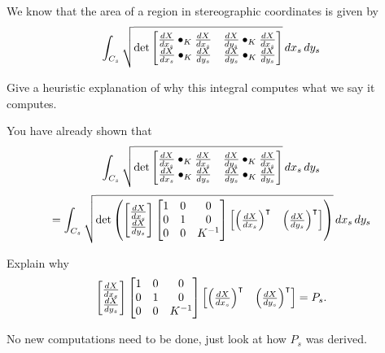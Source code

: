 \documentclass{ximera}
\begin{document}
We know that the area of a region in stereographic coordinates is given by 
\[
\int_{C_s} \sqrt{
  \det
  \begin{bmatrix}
    \dd[X]{x_s}\bullet_K \dd[X]{x_s} & \dd[X]{y_s}\bullet_K \dd[X]{x_s} \\
    \dd[X]{x_s}\bullet_K \dd[X]{y_s} & \dd[X]{y_s}\bullet_K \dd[X]{y_s}
  \end{bmatrix}
}\d x_s\d y_s
\]

\begin{problem}
  Give a heuristic explanation of why this integral computes what we
  say it computes.
\end{problem}

You have already shown that
\[
\int_{C_s} \sqrt{
  \det
  \begin{bmatrix}
    \dd[X]{x_s}\bullet_K \dd[X]{x_s} & \dd[X]{y_s}\bullet_K \dd[X]{x_s} \\
    \dd[X]{x_s}\bullet_K \dd[X]{y_s} & \dd[X]{y_s}\bullet_K \dd[X]{y_s}
  \end{bmatrix}
}\d x_s\d y_s
\]
\[
=
\int_{C_s} \sqrt{
  \det\left(
  \begin{bmatrix}
    \dd[X]{x_s}\\
    \dd[X]{y_s}
  \end{bmatrix}
  \begin{bmatrix}
    1 & 0 & 0\\
    0 & 1 & 0\\
    0 & 0 & K^{-1}
  \end{bmatrix}
  \begin{bmatrix}
    \left(\dd[X]{x_s}\right)^\transpose & \left(\dd[X]{y_s}\right)^\transpose
  \end{bmatrix}\right)
}\d x_s\d y_s
\]

\begin{problem}
  Explain why
  \[
\begin{bmatrix}
    \dd[X]{x_s}\\
    \dd[X]{y_s}
  \end{bmatrix}
  \begin{bmatrix}
    1 & 0 & 0\\
    0 & 1 & 0\\
    0 & 0 & K^{-1}
  \end{bmatrix}
  \begin{bmatrix}
    \left(\dd[X]{x_s}\right)^\transpose & \left(\dd[X]{y_s}\right)^\transpose
  \end{bmatrix} =P_s.
  \]
  \begin{hint}
    No new computations need to be done, just look at how $P_s$ was derived.
  \end{hint}
\end{problem}
\end{document}
